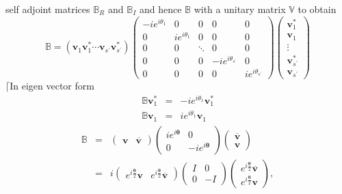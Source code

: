 \documentclass[aps,preprint]{revtex4}
\begin{document}
self adjoint matrices $\mathbb{B}_{R}$ and $\mathbb{B}_{I}$ and hence $%
\mathbb{B}$ with a unitary matrix $\mathbb{V}$ to obtain 
\begin{equation}
\mathbb{B}=\left( \mathbf{v}_{1}\mathbf{v}_{1}^{\ast }\mathbf{\cdots v}%
_{s^{\prime }}\mathbf{v}_{s^{\prime }}^{\ast }\right) \left( 
\begin{array}{ccccc}
-ie^{i\theta _{1}} & 0 & 0 & 0 & 0 \\ 
0 & ie^{i\theta _{1}} & 0 & 0 & 0 \\ 
0 & 0 & \ddots  & 0 & 0 \\ 
0 & 0 & 0 & -ie^{i\theta _{s^{\prime }}} & 0 \\ 
0 & 0 & 0 & 0 & ie^{i\theta _{s^{\prime }}}%
\end{array}%
\right) \left( 
\begin{array}{c}
\mathbf{v}_{1}^{\ast } \\ 
\mathbf{v}_{1} \\ 
\mathbf{\vdots } \\ 
\mathbf{v}_{s^{\prime }}^{\ast } \\ 
\mathbf{v}_{s^{\prime }}%
\end{array}%
\right) 
\end{equation}%
$\lceil $In eigen vector form%
\begin{eqnarray}
\mathbb{B}\mathbf{v}_{1}^{\ast } &=&-ie^{i\theta _{1}}\mathbf{v}_{1}^{\ast }
\\
\mathbb{B}\mathbf{v}_{1} &=&ie^{i\theta _{1}}\mathbf{v}_{1}
\end{eqnarray}%
\begin{eqnarray}
\mathbb{B} &=&\left( 
\begin{array}{cc}
\mathbf{v} & \overline{\mathbf{v}}%
\end{array}%
\right) \left( 
\begin{array}{cc}
ie^{i\mathbf{\theta }} & 0 \\ 
0 & -ie^{i\mathbf{\theta }}%
\end{array}%
\right) \left( 
\begin{array}{c}
\overline{\mathbf{v}} \\ 
\mathbf{v}%
\end{array}%
\right)  \\
&=&i\left( 
\begin{array}{cc}
e^{i\frac{\mathbf{\theta }}{2}}\mathbf{v} & e^{i\frac{\mathbf{\theta }}{2}}%
\overline{\mathbf{v}}%
\end{array}%
\right) \left( 
\begin{array}{cc}
I & 0 \\ 
0 & -I%
\end{array}%
\right) \left( 
\begin{array}{c}
e^{i\frac{\mathbf{\theta }}{2}}\overline{\mathbf{v}} \\ 
e^{i\frac{\mathbf{\theta }}{2}}\mathbf{v}%
\end{array}%
\right) ,
\end{eqnarray}
\end{document}
